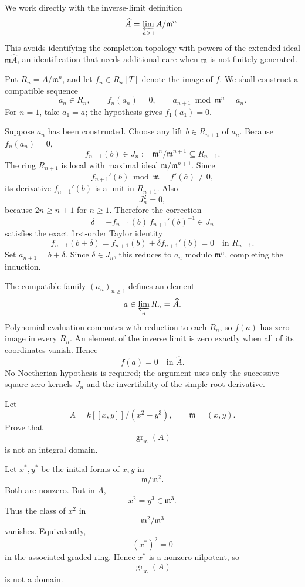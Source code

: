 \begin{solution}
We work directly with the inverse-limit definition
\[
\widehat A=\varprojlim_{n\ge1}A/\mathfrak m^n.
\]
This avoids identifying the completion topology with powers of the
extended ideal \(\mathfrak m\widehat A\), an identification that needs
additional care when \(\mathfrak m\) is not finitely generated.

Put \(R_n=A/\mathfrak m^n\), and let \(f_n\in R_n[T]\) denote the image
of \(f\). We shall construct a compatible sequence
\[
a_n\in R_n,\qquad f_n(a_n)=0,
\qquad a_{n+1}\bmod\mathfrak m^n=a_n.
\]
For \(n=1\), take \(a_1=\bar a\); the hypothesis gives
\(f_1(a_1)=0\).

Suppose \(a_n\) has been constructed. Choose any lift
\(b\in R_{n+1}\) of \(a_n\). Because \(f_n(a_n)=0\),
\[
f_{n+1}(b)\in J_n:=\mathfrak m^n/\mathfrak m^{n+1}
\subseteq R_{n+1}.
\]
The ring \(R_{n+1}\) is local with maximal ideal
\(\mathfrak m/\mathfrak m^{n+1}\). Since
\[
f_{n+1}'(b)\bmod\mathfrak m=\bar f'(\bar a)\ne0,
\]
its derivative \(f_{n+1}'(b)\) is a unit in \(R_{n+1}\). Also
\[
J_n^2=0,
\]
because \(2n\ge n+1\) for \(n\ge1\). Therefore the correction
\[
\delta=-f_{n+1}(b)\,f_{n+1}'(b)^{-1}\in J_n
\]
satisfies the exact first-order Taylor identity
\[
f_{n+1}(b+\delta)
=f_{n+1}(b)+\delta f_{n+1}'(b)=0
\quad\text{in }R_{n+1}.
\]
Set \(a_{n+1}=b+\delta\). Since \(\delta\in J_n\), this reduces
to \(a_n\) modulo \(\mathfrak m^n\), completing the induction.

The compatible family \((a_n)_{n\ge1}\) defines an element
\[
a\in\varprojlim_n R_n=\widehat A.
\]
Polynomial evaluation commutes with reduction to each \(R_n\), so
\(f(a)\) has zero image in every \(R_n\). An element of the inverse
limit is zero exactly when all of its coordinates vanish. Hence
\[
\boxed{f(a)=0\quad\text{in }\widehat A.}
\]
No Noetherian hypothesis is required; the argument uses only the
successive square-zero kernels \(J_n\) and the invertibility of the
simple-root derivative.
\end{solution}


\begin{problem}[CP-V-0089]
\label{prob:cp-v-0089}
Let
\[
A=k[[x,y]]/(x^2-y^3),
\qquad
\mathfrak m=(x,y).
\]
Prove that
\[
\operatorname{gr}_{\mathfrak m}(A)
\]
is not an integral domain.
\end{problem}

\begin{solution}
Let \(x^*,y^*\) be the initial forms of \(x,y\) in
\[
\mathfrak m/\mathfrak m^2.
\]
Both are nonzero. But in \(A\),
\[
x^2=y^3\in\mathfrak m^3.
\]
Thus the class of \(x^2\) in
\[
\mathfrak m^2/\mathfrak m^3
\]
vanishes. Equivalently,
\[
(x^*)^2=0
\]
in the associated graded ring. Hence \(x^*\) is a nonzero nilpotent, so
\[
\operatorname{gr}_{\mathfrak m}(A)
\]
is not a domain.
\end{solution}



